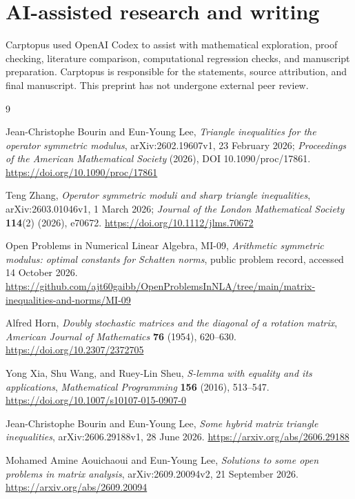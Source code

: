\documentclass[11pt]{article}
\begin{document}
\section*{AI-assisted research and writing}


Carptopus used OpenAI Codex to assist with mathematical exploration, proof checking,
literature comparison, computational regression checks, and manuscript preparation.
Carptopus is responsible for the statements, source attribution, and final manuscript.
This preprint has not undergone external peer review.

\begin{thebibliography}{9}
\footnotesize
\raggedright

Jean-Christophe Bourin and Eun-Young Lee,
\emph{Triangle inequalities for the operator symmetric modulus},
arXiv:2602.19607v1, 23 February 2026;
\emph{Proceedings of the American Mathematical Society} (2026),
DOI 10.1090/proc/17861.
\url{https://doi.org/10.1090/proc/17861}

Teng Zhang,
\emph{Operator symmetric moduli and sharp triangle inequalities},
arXiv:2603.01046v1, 1 March 2026; \emph{Journal of the London Mathematical Society}
\textbf{114}(2) (2026), e70672.
\url{https://doi.org/10.1112/jlms.70672}

Open Problems in Numerical Linear Algebra, MI-09,
\emph{Arithmetic symmetric modulus: optimal constants for Schatten norms},
public problem record, accessed 14 October 2026.
\url{https://github.com/ajt60gaibb/OpenProblemsInNLA/tree/main/matrix-inequalities-and-norms/MI-09}

Alfred Horn,
\emph{Doubly stochastic matrices and the diagonal of a rotation matrix},
\emph{American Journal of Mathematics} \textbf{76} (1954), 620--630.
\url{https://doi.org/10.2307/2372705}

Yong Xia, Shu Wang, and Ruey-Lin Sheu,
\emph{S-lemma with equality and its applications},
\emph{Mathematical Programming} \textbf{156} (2016), 513--547.
\url{https://doi.org/10.1007/s10107-015-0907-0}

Jean-Christophe Bourin and Eun-Young Lee,
\emph{Some hybrid matrix triangle inequalities},
arXiv:2606.29188v1, 28 June 2026.
\url{https://arxiv.org/abs/2606.29188}

Mohamed Amine Aouichaoui and Eun-Young Lee,
\emph{Solutions to some open problems in matrix analysis},
arXiv:2609.20094v2, 21 September 2026.
\url{https://arxiv.org/abs/2609.20094}

\end{thebibliography}
\end{document}
